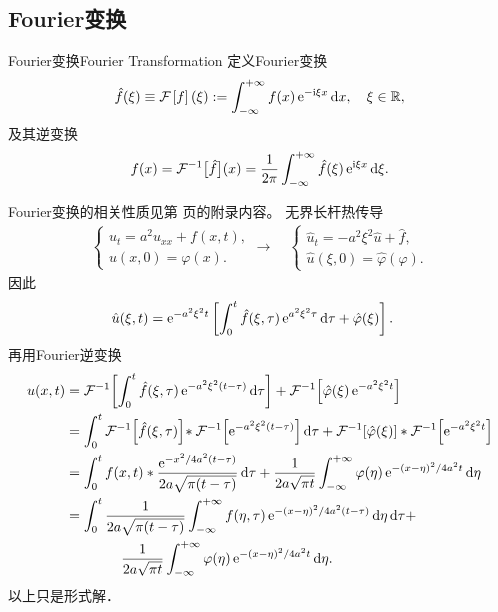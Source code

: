 \subsection{Fourier变换}
\setcounter{subsubsection}{1}
\begin{definition}{Fourier变换}{Fourier Transformation}
	定义Fourier变换
	\[\hat f(\xi)\equiv\mathcal F_\mathrm{\!\,}\left[f\right](\xi):=\int_{-\infty}^{+\infty} f(x)\mathop{}\!\mathrm{e}^{-\mathrm{i}\xi x}\mathop{}\!\mathrm{d} x,\quad \xi\in\mathbb R,\]
	及其逆变换
	\[f(x)=\mathcal F^{-1}\big[\hat f\big](x)=\frac1{2\pi}\int_{-\infty}^{+\infty}\hat f(\xi)\mathop{}\!\mathrm{e}^{\mathrm{i}\xi x}\mathop{}\!\mathrm{d}\xi.\]
\end{definition}
Fourier变换的相关性质见第 \pageref{The Property of Fourier Transformation} 页的附录内容。
\eg 无界长杆热传导
\begin{align*}
	\begin{cases}
		u_t=a^2u_{xx}+f(x,t),\\
		u(x,0)=\varphi(x).
	\end{cases}\longrightarrow\quad\begin{cases}
		\hat u_t=-a^2\xi^2\hat u+\hat f,\\
		\hat u(\xi,0)=\hat\varphi(\varphi).
	\end{cases}
\end{align*}
因此
\begin{align*}
	\hat u(\xi,t)&=\mathop{}\!\mathrm{e}^{-a^2\xi^2t}\left[\int_0^t\hat f(\xi,\tau)\mathop{}\!\mathrm{e}^{a^2\xi^2\tau}\mathop{}\!\mathrm{d}\tau+\hat\varphi(\xi)\right].
\end{align*}
再用Fourier逆变换
\begin{align*}
	u(x,t)&=\cfi{\int_0^t\hat f(\xi,\tau)\e{-a^2\xi^2(t-\tau)}\d\tau}+\cfi{\hat\varphi(\xi)\e{-a^2\xi^2t}}\\
	&=\int_0^t\cfi{\hat f(\xi,\tau)}\!\ast\cfi{\e{-a^2\xi^2(t-\tau)}}\d\tau+\cfi{\hat\varphi(\xi)}\ast\cfi{\e{-a^2\xi^2t}}\\
	&=\int_0^tf(x,t)\ast\frac{\e{-x^2/4a^2(t-\tau)}}{2a\sqrt{\pi(t-\tau)}}\d\tau+\frac1{2a\sqrt{\pi t}}\int\iti\varphi(\eta)\e{-(x-\eta)^2/4a^2t}\d\eta\\
	&=\int_0^t\frac1{2a\sqrt{\pi(t-\tau)}}\int\iti f(\eta,\tau)\e{-(x-\eta)^2/4a^2(t-\tau)}\d\eta\d\tau+\\
	&\qquad\qquad\frac1{2a\sqrt{\pi t}}\int\iti\varphi(\eta)\e{-(x-\eta)^2/4a^2t}\d\eta.
\end{align*}
以上只是形式解．
